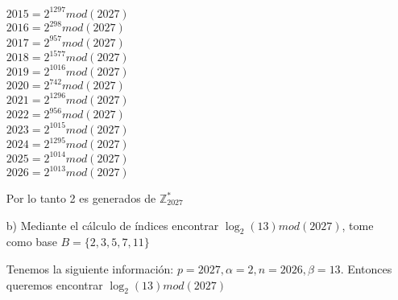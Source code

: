 \documentclass[12pt, letterpaper]{article}
\begin{document}
\begin{itemize}
\begin{multicols}{3}
$2015= 2^{1297} mod (2027)$\\
$2016= 2^{298} mod (2027)$\\
$2017= 2^{957} mod (2027)$\\
$2018= 2^{1577} mod (2027)$\\
$2019= 2^{1016} mod (2027)$\\
$2020= 2^{742} mod (2027)$\\
$2021= 2^{1296} mod (2027)$\\
$2022= 2^{956} mod (2027)$\\
$2023= 2^{1015} mod (2027)$\\
$2024= 2^{1295} mod (2027)$\\
$2025= 2^{1014} mod (2027)$\\
$2026= 2^{1013} mod (2027)$\\

\end{multicols}

Por lo tanto 2 es generados de $\mathbb{Z}^*_{2027}$

\item[b)] Mediante el cálculo de índices encontrar $\log_2{(13)}mod(2027)$, tome como base $B = \{2,3,5,7,11\}$

Tenemos la siguiente información: $p = 2027, \alpha = 2, n = 2026, \beta = 13$. Entonces queremos encontrar $\log_2{(13)} mod (2027)$


\end{itemize}
\end{document}
